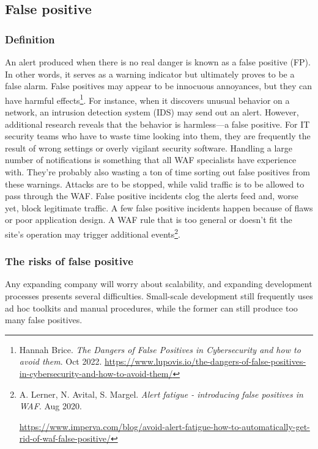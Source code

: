 \subsection{False positive}
\subsubsection{Definition}
\hspace{0.5cm}An alert produced when there is no real danger is known as a false positive (FP). In other words, it serves as a warning indicator but ultimately proves to be a false alarm. False positives may appear to be innocuous annoyances, but they can have harmful effects\footnote{Hannah Brice. \textit{The Dangers of False Positives in Cybersecurity and how to avoid them}. Oct 2022. 
\url{https://www.lupovis.io/the-dangers-of-false-positives-in-cybersecurity-and-how-to-avoid-them/}}.
For instance, when it discovers unusual behavior on a network, an intrusion detection system (IDS) may send out an alert. However, additional research reveals that the behavior is harmless—a false positive. For IT security teams who have to waste time looking into them, they are frequently the result of wrong settings or overly vigilant security software.
\newpage
Handling a large number of notifications is something that all WAF specialists have experience with. They're probably also wasting a ton of time sorting out false positives from these warnings. Attacks are to be stopped, while valid traffic is to be allowed to pass through the WAF. False positive incidents clog the alerts feed and, worse yet, block legitimate traffic. A few false positive incidents happen because of flaws or poor application design. A WAF rule that is too general or doesn't fit the site's operation may trigger additional events\footnote{A. Lerner, N. Avital, S. Margel. 
\textit{Alert fatigue - introducing false positives in WAF}. Aug 2020.
\raggedright\url{https://www.imperva.com/blog/avoid-alert-fatigue-how-to-automatically-get-rid-of-waf-false-positive/}}.
\subsubsection{The risks of false positive} 
\hspace{0.5cm}Any expanding company will worry about scalability, and expanding development processes presents several difficulties. Small-scale development still frequently uses ad hoc toolkits and manual procedures, while the former can still produce too many false positives.

